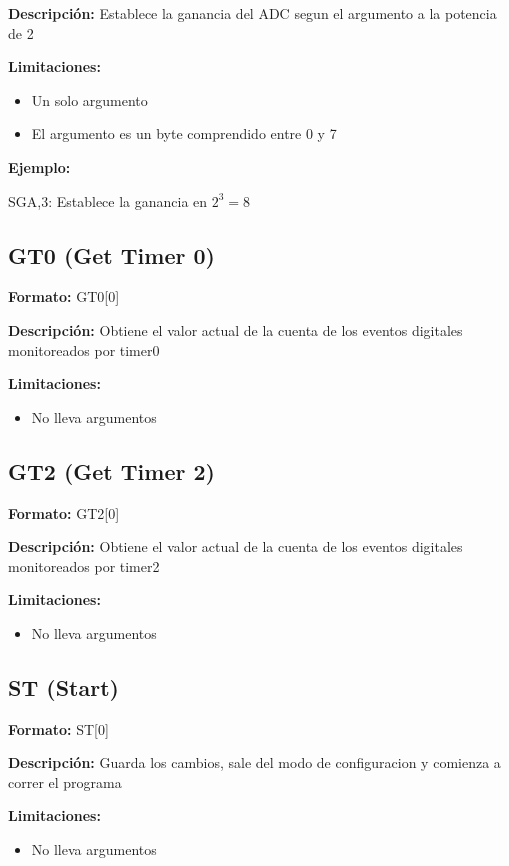 \textbf{Descripci\'on:}
Establece la ganancia del ADC segun el argumento a la potencia de 2

\textbf{Limitaciones:}
\begin{itemize}
  \item Un solo argumento
  \item El argumento es un byte comprendido entre 0 y 7
\end{itemize}

\textbf{Ejemplo:}

SGA,3: Establece la ganancia en $2^{3} = 8$


\subsection{GT0 (Get Timer 0)} %
\label{sub:gt0_get_timer_0}


\textbf{Formato:} GT0[0]

\textbf{Descripci\'on:}
Obtiene el valor actual de la cuenta de los eventos digitales monitoreados por timer0

\textbf{Limitaciones:}
\begin{itemize}
  \item No lleva argumentos
\end{itemize}

\subsection{GT2 (Get Timer 2)} %
\label{sub:gt2_get_timer_2}

\textbf{Formato:} GT2[0]

\textbf{Descripci\'on:}
Obtiene el valor actual de la cuenta de los eventos digitales monitoreados por timer2

\textbf{Limitaciones:}
\begin{itemize}
  \item No lleva argumentos
\end{itemize}

\subsection{ST (Start)} %
\label{sub:st_start}


\textbf{Formato:} ST[0]

\textbf{Descripci\'on:}
Guarda los cambios, sale del modo de configuracion y comienza a correr el programa

\textbf{Limitaciones:}
\begin{itemize}
  \item No lleva argumentos
\end{itemize}


\clearpage

